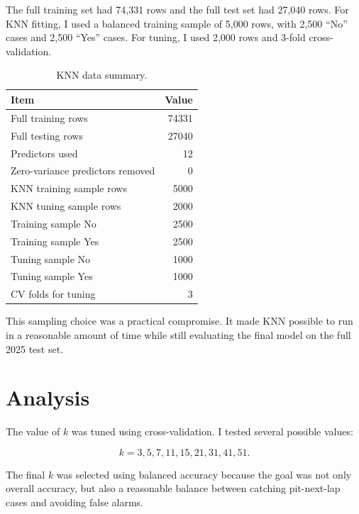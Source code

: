 \documentclass[11pt,oneside,openany]{book}
\begin{document}
The full training set had 74,331 rows and the full test set had 27,040 rows. For KNN fitting, I used a balanced training sample of 5,000 rows, with 2,500 ``No'' cases and 2,500 ``Yes'' cases. For tuning, I used 2,000 rows and 3-fold cross-validation.

\begin{table}[H]
\centering
\small
\caption{KNN data summary.}
\begin{tabular}{lr}
\toprule
Item & Value\\
\midrule
Full training rows & 74331\\
Full testing rows & 27040\\
Predictors used & 12\\
Zero-variance predictors removed & 0\\
KNN training sample rows & 5000\\
KNN tuning sample rows & 2000\\
Training sample No & 2500\\
Training sample Yes & 2500\\
Tuning sample No & 1000\\
Tuning sample Yes & 1000\\
CV folds for tuning & 3\\
\bottomrule
\end{tabular}
\end{table}

This sampling choice was a practical compromise. It made KNN possible to run in a reasonable amount of time while still evaluating the final model on the full 2025 test set.

\section{Analysis}

The value of \(k\) was tuned using cross-validation. I tested several possible values:

\[
k = 3, 5, 7, 11, 15, 21, 31, 41, 51.
\]

The final \(k\) was selected using balanced accuracy because the goal was not only overall accuracy, but also a reasonable balance between catching pit-next-lap cases and avoiding false alarms.
\end{document}
